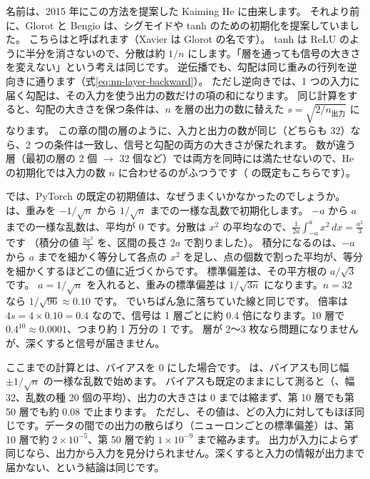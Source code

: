 名前は、2015 年にこの方法を提案した Kaiming He に由来します\cite{he2015delving}。
それより前に、Glorot と Bengio は、シグモイドや tanh のための初期化を提案していました\cite{glorot2010understanding}。
こちらはと呼ばれます（Xavier は Glorot の名です）。
tanh は ReLU のように半分を消さないので、分散は約 $1/n$ にします。「層を通っても信号の大きさを変えない」という考えは同じです。
逆伝播でも、勾配は同じ重みの行列を逆向きに通ります（式\eqref{eq:nn-layer-backward}）。
ただし逆向きでは、1 つの入力に届く勾配は、その入力を使う出力の数だけの項の和になります。
同じ計算をすると、勾配の大きさを保つ条件は、$n$ を層の出力の数に替えた $s=\sqrt{2/n_{\text{出力}}}$ になります。
この章の間の層のように、入力と出力の数が同じ（どちらも 32）なら、2 つの条件は一致し、信号と勾配の両方の大きさが保たれます。
数が違う層（最初の層の 2 個 $\to$ 32 個など）では両方を同時には満たせないので、He の初期化では入力の数 $n$ に合わせるのがふつうです（ の既定もこちらです）。

では、PyTorch の既定の初期値は、なぜうまくいかなかったのでしょうか。
 は、重みを $-1/\sqrt{n}$ から $1/\sqrt{n}$ までの一様な乱数で初期化します。
$-a$ から $a$ までの一様な乱数は、平均が 0 です。分散は $x^2$ の平均なので、$\frac{1}{2a}\int_{-a}^{a}x^2\,dx=\frac{a^2}{3}$ です
（積分の値 $\frac{2a^3}{3}$ を、区間の長さ $2a$ で割りました）。
積分になるのは、$-a$ から $a$ までを細かく等分して各点の $x^2$ を足し、点の個数で割った平均が、等分を細かくするほどこの値に近づくからです。
標準偏差は、その平方根の $a/\sqrt{3}$ です。
$a=1/\sqrt{n}$ を入れると、重みの標準偏差は $1/\sqrt{3n}$ になります。$n=32$ なら $1/\sqrt{96}\approx0.10$ です。
でいちばん急に落ちていた線と同じです。
倍率は $4s=4\times0.10=0.4$ なので、信号は 1 層ごとに約 0.4 倍になります。10 層で $0.4^{10}\approx0.0001$、つまり約 1 万分の 1 です。
層が 2〜3 枚なら問題になりませんが、深くすると信号が届きません。

ここまでの計算とは、バイアスを 0 にした場合です。
 は、バイアスも同じ幅 $\pm1/\sqrt{n}$ の一様な乱数で始めます。
バイアスも既定のままにして測ると（、幅 32、乱数の種 20 個の平均）、出力の大きさは 0 までは縮まず、第 10 層でも第 50 層でも約 0.08 で止まります。
ただし、その値は、どの入力に対してもほぼ同じです。データの間での出力の散らばり（ニューロンごとの標準偏差）は、第 10 層で約 $2\times10^{-5}$、第 50 層で約 $1\times10^{-9}$ まで縮みます。
出力が入力によらず同じなら、出力から入力を見分けられません。深くすると入力の情報が出力まで届かない、という結論は同じです。


